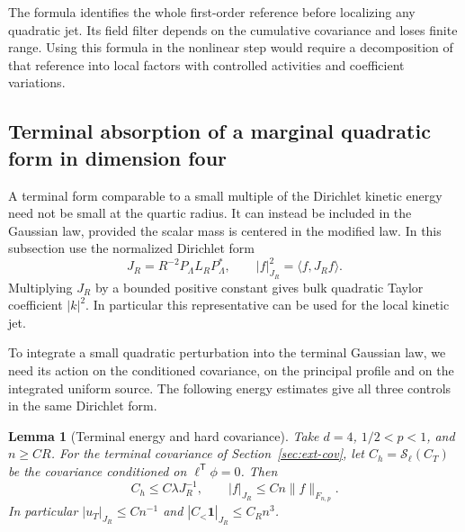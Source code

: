 \documentclass[11pt]{article}
\newtheorem{lemma}[theorem]{Lemma}
\theoremstyle{definition}
\newcommand{\one}{\mathbf 1}
\begin{document}
The formula identifies the whole first-order reference before
localizing any quadratic jet. Its field filter depends on the
cumulative covariance and loses finite range. Using this
formula in the nonlinear step would require a decomposition of
that reference into local factors with controlled activities
and coefficient variations.

\subsection{Terminal absorption of a marginal quadratic form in dimension four}
\label{sec:kinetic-terminal-absorption}

A terminal form comparable to a small multiple of the Dirichlet
kinetic energy need not be small at the quartic radius. It can
instead be included in the Gaussian law, provided the scalar
mass is centered in the modified law. In this subsection use
the normalized Dirichlet form
\begin{equation}
 J_R=R^{-2}P_\Lambda L_RP_\Lambda^*,
 \qquad |f|_{J_R}^2=\langle f,J_Rf\rangle.
\end{equation}
Multiplying \(J_R\) by a bounded positive constant gives bulk
quadratic Taylor coefficient \(|k|^2\). In particular this
representative can be used for the local kinetic jet.

To integrate a small quadratic perturbation into the terminal
Gaussian law, we need its action on the conditioned covariance,
on the principal profile and on the integrated uniform source. The
following energy estimates give all three controls in the same
Dirichlet form.

\begin{lemma}[Terminal energy and hard covariance]
\label{lem:kinetic-terminal-energy}
Take \(d=4\), \(1/2<p<1\), and \(n\ge C R\). For the
terminal covariance of Section~\ref{sec:ext-cov}, let
\(C_h=\mathcal S_\ell(C_T)\) be the covariance conditioned on
\(\ell^{\mathsf T}\phi=0\). Then
\begin{equation}
 C_h\le C\lambda J_R^{-1},\qquad
 |f|_{J_R}\le C n\|f\|_{F_{n,p}} .
\end{equation}
In particular \(|u_T|_{J_R}\le C n^{-1}\) and
\(|C_<\one|_{J_R}\le C_R n^3\).
\end{lemma}
\end{document}
